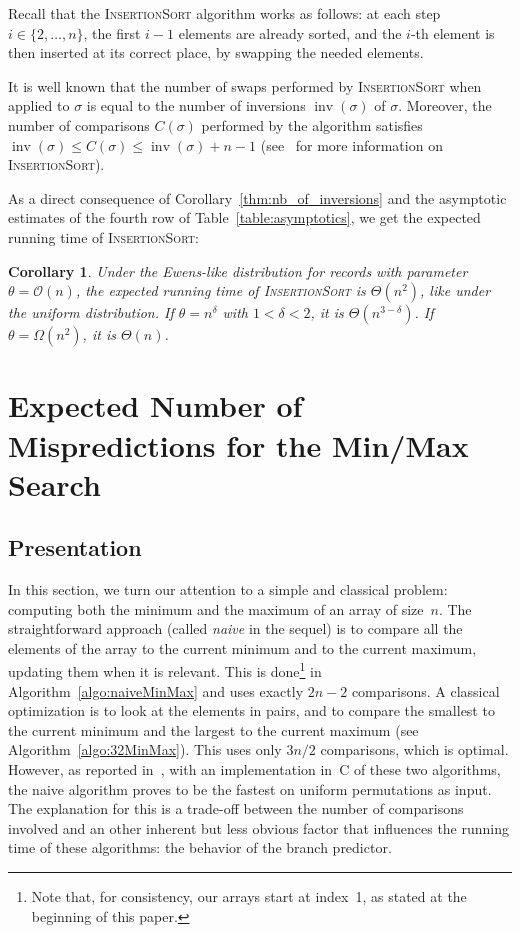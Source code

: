 \documentclass[proceedings]{aofa}
\renewcommand{\O}{\mathcal{O}}
\newcommand{\InsertSort}{\textsc{InsertionSort}\xspace}
\DeclareMathOperator{\inv}{inv}
\newtheorem{corollary}[theorem]{Corollary}
\begin{document}
Recall that the \InsertSort algorithm works as follows: at each step
$i\in\{2,\ldots,n\}$, the first $i-1$ elements are already sorted, and the
$i$-th element is then inserted at its correct place, by swapping the needed elements. 

It is well known that the number of swaps performed by \InsertSort when applied to $\sigma$ is equal to the number of inversions $\inv(\sigma)$ of $\sigma$. 
Moreover, the number of comparisons $C(\sigma)$ performed by the algorithm satisfies $\inv(\sigma)\leq C(\sigma)\leq \inv(\sigma)  +  n -1$ 
(see~\cite{CoLeRi01} for more information on \InsertSort).

As a direct consequence of Corollary~\ref{thm:nb_of_inversions} and the asymptotic estimates of the fourth row of Table~\ref{table:asymptotics}, 
we get the expected running time of \InsertSort:
\begin{corollary}\label{cor:insert sort}
Under the Ewens-like distribution for records with parameter $\theta=\O(n)$, the expected running time of \InsertSort is $\Theta(n^{2})$, like under the uniform distribution. 
If $\theta=n^{\delta}$ with $1<\delta<2$, it is $\Theta(n^{3-\delta})$. If $\theta=\Omega(n^{2})$, it is $\Theta(n)$.
\end{corollary}

\section{Expected Number of Mispredictions for the Min/Max Search}\label{sec:mispredictions}

\subsection{Presentation}\label{sec:presentation}
In this section, we turn our attention to a simple and classical problem: computing both the minimum and the maximum of an array of size~$n$. The straightforward approach (called {\em naive} in the sequel) is to compare all the elements of the array to the current minimum and to the current maximum, updating them when it is relevant. This is done\footnote{Note that, for consistency, our arrays start at index~1, as stated at the beginning of this paper.} in Algorithm~\ref{algo:naiveMinMax} and uses exactly $2n-2$ comparisons.
A classical optimization is to look at the elements in pairs, and to compare the smallest to the current minimum and the largest to the current maximum (see Algorithm~\ref{algo:32MinMax}). This uses only $3n/2$ comparisons, which is optimal.
However, as reported in~\cite{AuNiPi16}, with an implementation in~C of these two algorithms, the naive algorithm proves to be the fastest on uniform permutations as input. The explanation for this is a trade-off between the number of comparisons involved and an other inherent but less obvious factor that influences the running time of these algorithms: the behavior of the branch predictor.
\end{document}

